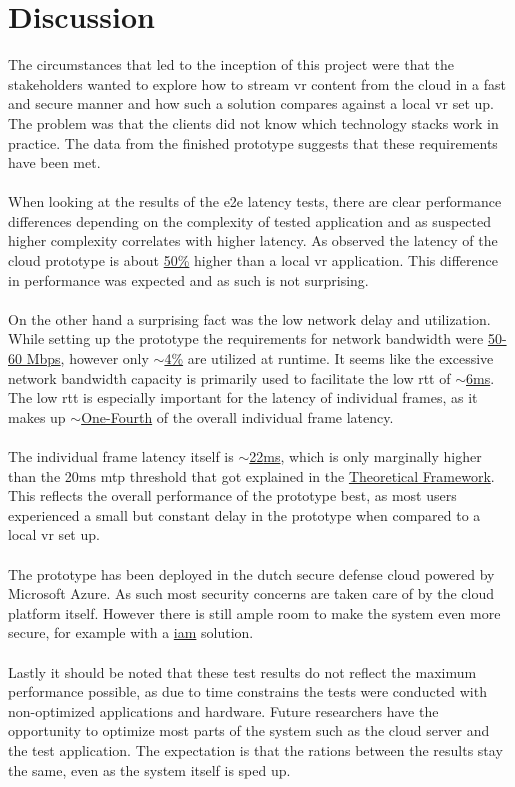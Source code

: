 \section{Discussion}

The circumstances that led to the inception of this project were that the stakeholders wanted to explore how to stream \acrshort{vr} content from the cloud in a fast and secure manner and how such a solution compares against a local \acrshort{vr} set up. The problem was that the clients did not know which technology stacks work in practice. The data from the finished prototype suggests that these requirements have been met.
\\ \\
When looking at the results of the \acrfull{e2e} latency tests, there are clear performance differences depending on the complexity of tested application and as suspected higher complexity correlates with higher latency. As observed the latency of the cloud prototype is about \hyperref[sec:res:t1]{50\%} higher than a local \acrshort{vr} application. This difference in performance was expected and as such is not surprising.
\\ \\
On the other hand a surprising fact was the low network delay and utilization. While setting up the prototype the requirements for network bandwidth were \hyperref[sec:res:t4]{50-60 Mbps}, however only \hyperref[sec:res:t1]{$\sim$4\%} are utilized at runtime. It seems like the excessive network bandwidth capacity is primarily used to facilitate the low \acrfull{rtt} of \hyperref[sec:res:t2]{$\sim$6\acrshort{ms}}. The low \acrshort{rtt} is especially important for the latency of individual frames, as it makes up \hyperref[sec:res:t1]{$\sim$One-Fourth} of the overall individual frame latency.
\\ \\
The individual frame latency itself is \hyperref[sec:res:t3]{$\sim$22\acrshort{ms}}, which is only marginally higher than the 20\acrshort{ms} \acrshort{mtp} threshold that got explained in the \hyperref[sec:theo]{Theoretical Framework}. This reflects the overall performance of the prototype best, as most users experienced a small but constant delay in the prototype when compared to a local \acrshort{vr} set up.
\\ \\
The prototype has been deployed in the dutch secure defense cloud powered by Microsoft Azure. As such most security concerns are taken care of by the cloud platform itself. However there is still ample room to make the system even more secure, for example with a \hyperref[sec:theo:iam]{\acrfull{iam}} solution.
\\ \\
Lastly it should be noted that these test results do not reflect the maximum performance possible, as due to time constrains the tests were conducted with non-optimized applications and hardware. Future researchers have the opportunity to optimize most parts of  the system such as the cloud server and the test application. The expectation is that the rations between the results stay the same, even as the system itself is sped up.